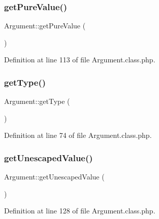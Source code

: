 \hypertarget{classArgument_a54140067b590d8ce8dcd7d09f56519cd}{}\label{classArgument_a54140067b590d8ce8dcd7d09f56519cd} 
\subsubsection{\texorpdfstring{get\+Pure\+Value()}{getPureValue()}}
{\footnotesize\ttfamily Argument\+::get\+Pure\+Value (\begin{DoxyParamCaption}{ }\end{DoxyParamCaption})}



Definition at line 113 of file Argument.\+class.\+php.

\hypertarget{classArgument_a62ea3d6e7689c8a40f6f9722e76fa7a8}{}\label{classArgument_a62ea3d6e7689c8a40f6f9722e76fa7a8} 
\subsubsection{\texorpdfstring{get\+Type()}{getType()}}
{\footnotesize\ttfamily Argument\+::get\+Type (\begin{DoxyParamCaption}{ }\end{DoxyParamCaption})}



Definition at line 74 of file Argument.\+class.\+php.

\hypertarget{classArgument_a45a70c173c816e9cf2c7c5f396a92a6f}{}\label{classArgument_a45a70c173c816e9cf2c7c5f396a92a6f} 
\subsubsection{\texorpdfstring{get\+Unescaped\+Value()}{getUnescapedValue()}}
{\footnotesize\ttfamily Argument\+::get\+Unescaped\+Value (\begin{DoxyParamCaption}{ }\end{DoxyParamCaption})}



Definition at line 128 of file Argument.\+class.\+php.

\hypertarget{classArgument_a53b70d0071096047437015737d5d7728}{}\label{classArgument_a53b70d0071096047437015737d5d7728} 
